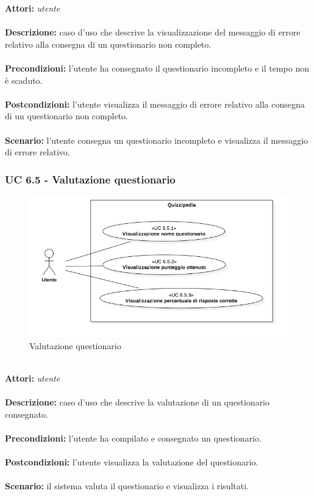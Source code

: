 \documentclass[a4paper,11pt]{article}
\begin{document}
\textbf{Attori:} \textit{utente}
\\ \\
\textbf{Descrizione:} caso d'uso che descrive la visualizzazione del messaggio di errore relativo alla consegna di un questionario non completo.\\
\\
\textbf{Precondizioni:} l'utente ha consegnato il questionario incompleto e il tempo non è scaduto.\\
\\
\textbf{Postcondizioni:} l'utente visualizza il messaggio di errore relativo alla consegna di un questionario non completo.\\
\\
\textbf{Scenario:} l’utente consegna un questionario incompleto e visualizza il messaggio di errore relativo.\\


\subsubsection{UC 6.5 - Valutazione questionario}

\begin{figure}[h!]
\centering
\includegraphics[scale=0.6]{../immagini/UC6_5.png}
\caption{Valutazione questionario}
\end{figure}
\ \\
\textbf{Attori:} \textit{utente}
\\ \\
\textbf{Descrizione:} caso d'uso che descrive la valutazione di un questionario consegnato.\\
\\
\textbf{Precondizioni:} l'utente ha compilato e consegnato un questionario.\\
\\
\textbf{Postcondizioni:} l'utente visualizza la valutazione del questionario.\\
\\
\textbf{Scenario:} il sistema valuta il questionario e visualizza i risultati.\\
\end{document}
